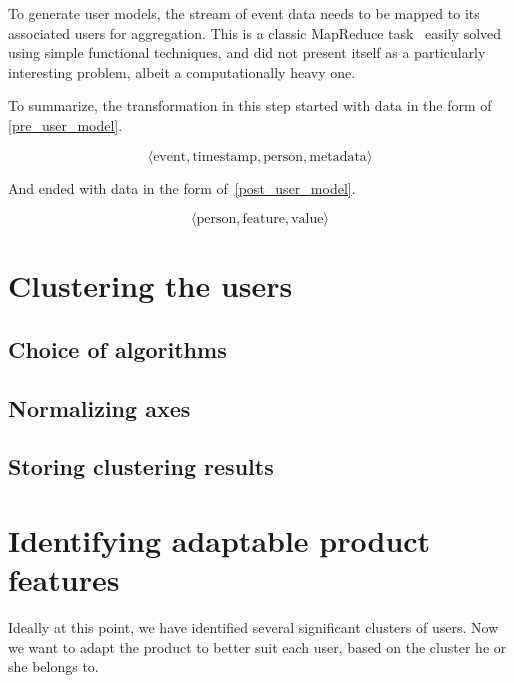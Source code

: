 To generate user models, the stream of event data needs to be mapped to its associated users for aggregation. This is a classic MapReduce task~\cite{Dean2008} easily solved using simple functional techniques, and did not present itself as a particularly interesting problem, albeit a computationally heavy one.

To summarize, the transformation in this step started with data in the form of \eqref{pre_user_model}.

\begin{equation}
  \langle \text{event}, \text{timestamp}, \text{person}, \text{metadata} \rangle
  \label{pre_user_model}
\end{equation}

And ended with data in the form of~\eqref{post_user_model}.

\begin{equation}
  \langle \text{person}, \text{feature}, \text{value} \rangle
  \label{post_user_model}
\end{equation}

\section{Clustering the users}
\label{sec:clustering}

\subsection{Choice of algorithms}
\label{sub:clustering_algorithms}

\subsection{Normalizing axes}
\label{sub:normalizing_axes}

\subsection{Storing clustering results}
\label{sub:storing_results}

\section{Identifying adaptable product features}
\label{sec:identifying_adaptability}

Ideally at this point, we have identified several significant clusters of users. Now we want to adapt the product to better suit each user, based on the cluster he or she belongs to.


